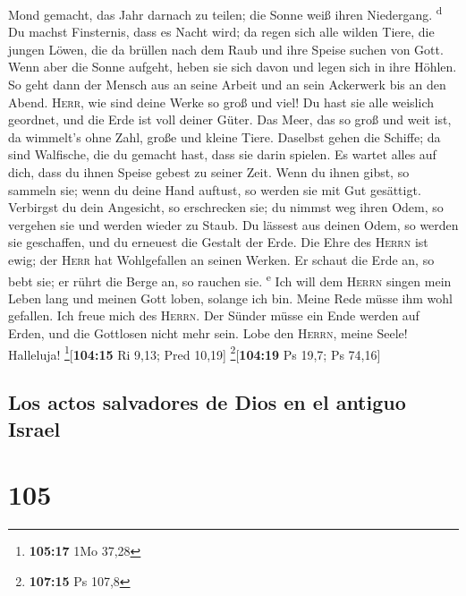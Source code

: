 Mond gemacht, das Jahr darnach zu teilen; die Sonne weiß ihren
Niedergang. \textsuperscript{d}  Du machst Finsternis,
dass es Nacht wird; da regen sich alle wilden Tiere,  die
jungen Löwen, die da brüllen nach dem Raub und ihre Speise suchen von
Gott.  Wenn aber die Sonne aufgeht, heben sie sich davon
und legen sich in ihre Höhlen.  So geht dann der Mensch
aus an seine Arbeit und an sein Ackerwerk bis an den Abend.
 \textsc{Herr}, wie sind deine Werke so groß und viel! Du
hast sie alle weislich geordnet, und die Erde ist voll deiner Güter.
 Das Meer, das so groß und weit ist, da wimmelt's ohne
Zahl, große und kleine Tiere.  Daselbst gehen die
Schiffe; da sind Walfische, die du gemacht hast, dass sie darin spielen.
 Es wartet alles auf dich, dass du ihnen Speise gebest zu
seiner Zeit.  Wenn du ihnen gibst, so sammeln sie; wenn
du deine Hand auftust, so werden sie mit Gut gesättigt. 
Verbirgst du dein Angesicht, so erschrecken sie; du nimmst weg ihren
Odem, so vergehen sie und werden wieder zu Staub.  Du
lässest aus deinen Odem, so werden sie geschaffen, und du erneuest die
Gestalt der Erde.  Die Ehre des \textsc{Herrn} ist ewig;
der \textsc{Herr} hat Wohlgefallen an seinen Werken.  Er
schaut die Erde an, so bebt sie; er rührt die Berge an, so rauchen sie.
\textsuperscript{e}  Ich will dem \textsc{Herrn} singen
mein Leben lang und meinen Gott loben, solange ich bin. 
Meine Rede müsse ihm wohl gefallen. Ich freue mich des \textsc{Herrn}.
 Der Sünder müsse ein Ende werden auf Erden, und die
Gottlosen nicht mehr sein. Lobe den \textsc{Herrn}, meine Seele!
Halleluja! \footnote{\textbf{105:17} 1Mo 37,28}{[}\textbf{104:15} Ri
9,13; Pred 10,19{]} \footnote{\textbf{107:15} Ps 107,8}{[}\textbf{104:19}
Ps 19,7; Ps 74,16{]}

\hypertarget{los-actos-salvadores-de-dios-en-el-antiguo-israel}{%
\subsection{Los actos salvadores de Dios en el antiguo
Israel}\label{los-actos-salvadores-de-dios-en-el-antiguo-israel}}

\hypertarget{section-104}{%
\section{105}\label{section-104}}

